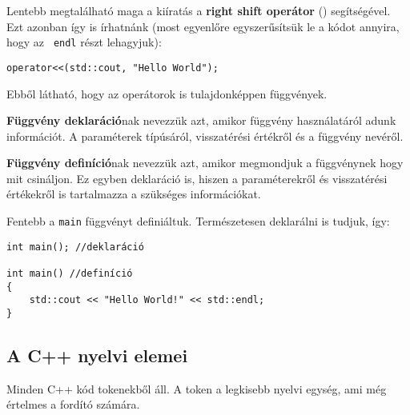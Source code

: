 \documentclass[a4paper,11.5pt,table]{article}
\begin{document}
	\medskip
	Lentebb megtalálható maga a kiíratás a \textbf{right shift operátor} (\texttt{\<}) segítségével. Ezt azonban így is írhatnánk (most egyenlőre egyszerűsítsük le a kódot annyira, hogy az \texttt{\< endl} részt lehagyjuk):
	\begin{lstlisting}
operator<<(std::cout, "Hello World");
	\end{lstlisting}
	Ebből látható, hogy az operátorok is tulajdonképpen függvények.
	
	\medskip
	\textbf{Függvény deklaráció}nak nevezzük azt, amikor függvény használatáról adunk információt. A paraméterek típúsáról, visszatérési értékről és a függvény nevéről.
	
	\medskip
	\textbf{Függvény definíció}nak nevezzük azt, amikor megmondjuk a függvénynek hogy mit csináljon. Ez egyben deklaráció is, hiszen a paraméterekről és visszatérési értékekről is tartalmazza a szükséges információkat.
	
	\medskip
	Fentebb a \texttt{main} függvényt definiáltuk. Természetesen deklarálni is tudjuk, így:
	\begin{lstlisting}
int main(); //deklaráció	

int main() //definíció
{
	std::cout << "Hello World!" << std::endl;
}
	\end{lstlisting}
	\subsection{A C++ nyelvi elemei}
	Minden C++ kód tokenekből áll. A token a legkisebb nyelvi egység, ami még értelmes a fordító számára. %
	
\end{document}
